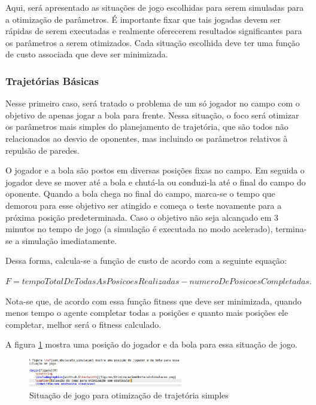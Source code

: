\documentclass[a4paper,12pt]{article}
\begin{document}
Aqui, será apresentado as situações de jogo escolhidas para serem simuladas para a otimização de parâmetros. É importante fixar que tais jogadas devem ser rápidas de serem executadas e realmente oferecerem resultados significantes para os parâmetros a serem otimizados. Cada situação escolhida deve ter uma função de custo associada que deve ser minimizada.


\subsubsection{Trajetórias Básicas}

Nesse primeiro caso, será tratado o problema de um só jogador no campo com o objetivo de apenas jogar a bola para frente. Nessa situação, o foco será otimizar os parâmetros mais simples do planejamento de trajetória, que são todos não relacionados ao desvio de oponentes, mas incluindo os parâmetros relativos à repulsão de paredes.

O jogador e a bola são postos em diversas posições fixas no campo. Em seguida o jogador deve se mover até a bola e chutá-la ou conduzi-la até o final do campo do oponente. Quando a bola chega no final do campo, marca-se o tempo que demorou para esse objetivo ser atingido e começa o teste novamente para a próxima posição predeterminada. Caso o objetivo não seja alcançado em 3 minutos no tempo de jogo (a simulação é executada no modo acelerado), termina-se a simulação imediatamente.

Dessa forma, calcula-se a função de custo de acordo com a seguinte equação:

$ F = tempoTotalDeTodasAsPosicoesRealizadas - numeroDePosicoesCompletadas. $
 
Nota-se que, de acordo com essa função fitness que deve ser minimizada, quando menos tempo o agente completar todas a posições e quanto mais posições ele completar, melhor será o fitness calculado.

A figura \ref{fig:sem_obstaculo_simulacao} mostra uma posição do jogador e da bola para essa situação de jogo.

\begin{figure}[H]
	\centering
	\includegraphics[width=0.6\textwidth]{figures/OtimizacaoSemObstaculoSimulacao.png}
	\caption{Situação de jogo para otimização de trajetória simples}
	\label{fig:sem_obstaculo_simulacao}
\end{figure}
\end{document}
